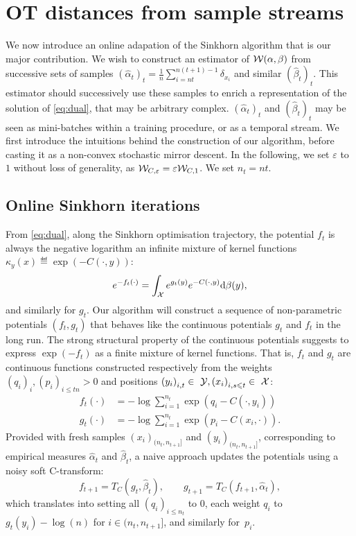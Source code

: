 
\section{OT distances from sample streams}

We now introduce an online adapation of the Sinkhorn algorithm that is our major contribution. We
wish to construct an estimator of $\mathcal{W}(\alpha,\beta)$ from successive sets of
samples $(\hat \alpha_t)_t = \frac{1}{n} \sum_{i=nt}^{n(t+1) - 1} \delta_{x_i}$
 and similar ${(\hat \beta_t)}_t$. This estimator should
successively use these samples to enrich a representation of the solution of
\eqref{eq:dual}, that may be arbitrary complex. $(\hat \alpha_t)_t$ and $(\hat
\beta_t)_t$ may be seen as mini-batches within a training procedure, or as a
temporal stream. We first introduce the intuitions behind the construction of
our algorithm, before casting it as a non-convex stochastic mirror descent. In the following, we 
set $\varepsilon$ to $1$ without loss of generality, as $\mathcal{W}_{C, \varepsilon} = \varepsilon \mathcal{W}_{C, 1}$. 
We set $n_t = nt$.

\subsection{Online Sinkhorn iterations}

From \eqref{eq:dual}, along the Sinkhorn optimisation trajectory, the potential $f_t$ is always the negative logarithm an
infinite mixture of kernel functions $\kappa_y(x) \eqdef \exp(-C(\cdot, y))$:
\begin{equation*}
    e^{-f_t(\cdot)} = 
    \int_{\mathcal{X}} e^{g_t(y)}  e^{-C(\cdot, y)} \textrm{d} \beta(y),
\end{equation*}
and similarly for $g_t$. Our algorithm will construct a sequence of
non-parametric potentials $(f_t, g_t)$ that behaves like the continuous
potentials $g_t$ and $f_t$ in the long run. The strong structural property of
the continuous potentials suggests to express
$\exp(-f_t)$ as a finite mixture of kernel functions.
That is, $f_t$ and $g_t$ are continuous functions constructed
respectively from the weights ${(q_i)}_{i}, {(p_i)}_{i \leq tn} > 0$ and
positions ${(y_i)}_{i,t} \in~\mathcal{Y}, {(x_i)}_{i,s\leqslant t} \in~\mathcal{X}$:
\begin{align}\label{eq:param}
    f_t(\cdot) &= - \log \sum_{i=1}^{n_t} 
    \exp(q_i - C(\cdot, y_i)) \\
    g_t(\cdot) &= - \log \sum_{i=1}^{n_t}
    \exp(p_i - C(x_i, \cdot)).
\end{align}
Provided with fresh samples $(x_i)_{(n_t, n_{t+1}]}$ and $(y_i)_{(n_t, n_{t+1}]}$, 
corresponding to empirical measures $\hat \alpha_t$ and $\hat \beta_t$, a naive approach
 updates the potentials using a noisy soft C-transform:
\begin{equation}\label{eq:updates}
     f_{t+1} = T_{C}(g_t, \hat \beta_t),
    \qquad g_{t+1} = T_{C}(f_{t+1}, \hat \alpha_t),
\end{equation}
which translates into setting all $(q_i)_{i \leq n_t}$ to $0$, each weight
 $q_i$ to $g_t(y_i) - \log(n)$ for $i \in (n_t, n_{t+1}]$, and similarly for~$p_i$.

